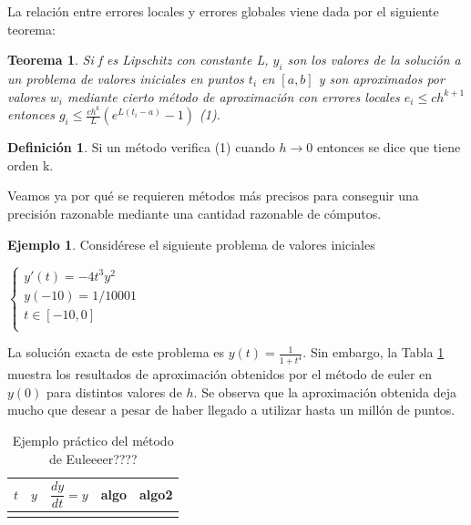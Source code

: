 \documentclass{article}
\theoremstyle{theorem-style}  %
\newtheorem{theorem}{Teorema}[section]  %
\theoremstyle{definition}
\newtheorem{definition}{Definición}[section]
\theoremstyle{example-style}
\newtheorem{example}{Ejemplo}[section]
\begin{document}
	La relación entre errores locales y errores globales viene dada por el siguiente teorema: \\
	
	\begin{theorem}
	Si f es Lipschitz con constante L, $y_i$ son los valores de la solución a un problema de valores iniciales en puntos $t_i$ en $[a,b]$ y son aproximados por valores $w_i$ mediante cierto método de aproximación con errores locales $e_i \leq c h^{k+1}$ entonces $g_i \le \frac{c h^k}{L} (e^{L(t_i-a)}-1)$ (1).\\
	\end{theorem} 
	
	\begin{definition} Si un método verifica (1) cuando $h \to 0$ entonces se dice que tiene orden k.
	\end{definition}
	
	Veamos ya por qué se requieren métodos más precisos para conseguir una precisión razonable mediante una cantidad razonable de cómputos. \\
	
	\begin{example} Considérese el siguiente problema de valores iniciales
		\begin{center}
			$\begin{cases}
			y'(t) = -4 t^3 y^2 \\
			y(-10) = 1/10001 \\
			t \in [-10,0] \\
			\end{cases}$
		\end{center}
		La solución exacta de este problema es $y(t)=\frac{1}{1+t^4}$. Sin embargo, la Tabla \ref{ej:ejemplo1} muestra los resultados de aproximación obtenidos por el método de euler en $y(0)$ para distintos valores de $h$. Se observa que la aproximación obtenida  deja mucho que desear a pesar de haber llegado a utilizar hasta un millón de puntos. 
	\end{example}

	\begin{table}
		\centering
		\begin{tabular}{|| c | c | c | c | c ||}
			\hline
			\hline
			$t$ &  $y$ & $\dfrac{dy}{dt}=y$ & algo & algo2\\
			\hline\\
			
		\end{tabular}
		\caption{Ejemplo práctico del método de Euleeeer????}
		\label{ej:ejemplo1}
	\end{table}
\end{document}
